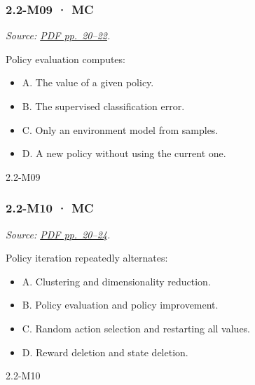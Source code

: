 \noindent\begin{minipage}{\linewidth}

\subsubsection{2.2-M09 · MC}\label{m09-mc-4}

\emph{Source:
\href{../Lecture\%20Slides/2.2.\%20Markov\%20decision\%20processes.pdf\#page=20}{PDF
pp.~20--22}.}

Policy evaluation computes:

\begin{itemize}
\tightlist
\item
  A. The value of a given policy.
\item
  B. The supervised classification error.
\item
  C. Only an environment model from samples.
\item
  D. A new policy without using the current one.
\end{itemize}

\begin{solution}[8mm]{2.2-M09}

\end{solution}
\end{minipage}\par\medskip

\noindent\begin{minipage}{\linewidth}

\subsubsection{2.2-M10 · MC}\label{m10-mc-4}

\emph{Source:
\href{../Lecture\%20Slides/2.2.\%20Markov\%20decision\%20processes.pdf\#page=20}{PDF
pp.~20--24}.}

Policy iteration repeatedly alternates:

\begin{itemize}
\tightlist
\item
  A. Clustering and dimensionality reduction.
\item
  B. Policy evaluation and policy improvement.
\item
  C. Random action selection and restarting all values.
\item
  D. Reward deletion and state deletion.
\end{itemize}

\begin{solution}[8mm]{2.2-M10}

\end{solution}
\end{minipage}\par\medskip

